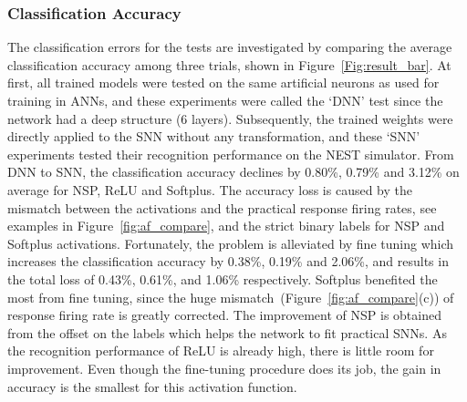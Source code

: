 	\subsubsection{Classification Accuracy}
	The classification errors for the tests are investigated by comparing the average classification accuracy among three trials, shown in Figure~\ref{Fig:result_bar}.
	At first, all trained models were tested on the same artificial neurons as used for training in ANNs, and these experiments were called the `DNN' test since the network had a deep structure (6 layers).
	Subsequently, the trained weights were directly applied to the SNN without any transformation, and these `SNN' experiments tested their recognition performance on the NEST simulator.
	From DNN to SNN, the classification accuracy declines by 0.80\%, 0.79\% and 3.12\% on average for NSP, ReLU and Softplus.
	The accuracy loss is caused by the mismatch between the activations and the practical response firing rates, see examples in Figure~\ref{fig:af_compare}, and the strict binary labels for NSP and Softplus activations.
	Fortunately, the problem is alleviated by fine tuning which increases the classification accuracy by 0.38\%, 0.19\% and 2.06\%, and results in the total loss of 0.43\%, 0.61\%, and 1.06\% respectively.
	Softplus benefited the most from fine tuning, since the huge mismatch~(Figure~\ref{fig:af_compare}(c)) of response firing rate is greatly corrected.
	The improvement of NSP is obtained from the offset on the labels which helps the network to fit practical SNNs.
	As the recognition performance of ReLU is already high, there is little room for improvement.
	Even though the fine-tuning procedure does its job, the gain in accuracy is the smallest for this activation function.




